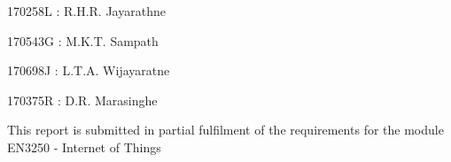 \begin{titlepage}
\begin{flushleft}
{\setlength{\itemindent}{1.7in}
\item 170258L 
      \tab
      :  R.H.R.  Jayarathne
\item 170543G
      \tab
      :  M.K.T. Sampath
 
\item 170698J
      \tab
      :  L.T.A. Wijayaratne

\item 170375R
      \tab
      :  D.R. Marasinghe


}
\end{flushleft}


\begin{center}
\vspace{\baselineskip}
\vspace{\baselineskip}
\vspace{\baselineskip}
\vspace{\baselineskip}
\vspace{\baselineskip}
\vspace{\baselineskip}
\vspace{\baselineskip}


 {\fontsize{10}{13}\selectfont This report is submitted in partial fulfilment of the requirements for the module}\\
  {\fontsize{10}{13}\selectfont EN3250 - Internet of Things}
 \end{center} 

\end{titlepage}



 




